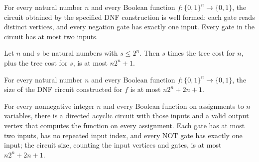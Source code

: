 \begin{theorem}
\label{BoolCircuit.dnfDAG_isFaninTwo}
\leanok
{}
For every natural number $n$ and every Boolean function $f\colon\{0,1\}^n\to\{0,1\}$,
the circuit obtained by the specified DNF construction is well formed: each gate reads
distinct vertices, and every negation gate has exactly one input. Every gate in the
circuit has at most two inputs.
\end{theorem}

\begin{theorem}
\label{BoolCircuit.dnf_cost_le}
\leanok
{}
Let $n$ and $s$ be natural numbers with $s \le 2^n$. Then $s$ times the tree cost for
$n$, plus the tree cost for $s$, is at most $n2^n+1$.
\end{theorem}

\begin{theorem}
\label{BoolCircuit.dnfDAG_size_le}
\leanok
{}
For every natural number $n$ and every Boolean function $f\colon\{0,1\}^n\to\{0,1\}$,
the size of the DNF circuit constructed for $f$ is at most $n2^n+2n+1$.
\end{theorem}

\begin{theorem}
\label{BoolCircuit.exists_dagCircuit_faninTwo_size_le}
\leanok
{}
For every nonnegative integer $n$ and every Boolean function on assignments to $n$
variables, there is a directed acyclic circuit with those inputs and a valid output
vertex that computes the function on every assignment. Each gate has at most two inputs,
has no repeated input index, and every NOT gate has exactly one input; the circuit size,
counting the input vertices and gates, is at most $n2^n+2n+1$.
\end{theorem}
